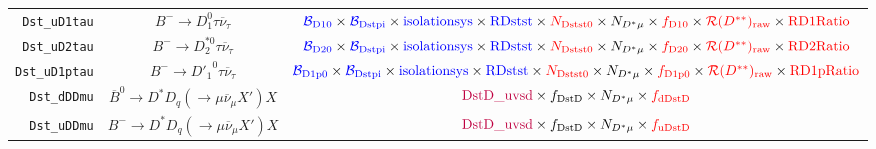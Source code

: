 \begin{landscape}
\begin{table}
\begin{tabular}{r|c|c}
  \texttt{Dst\_uD1tau} &                 $B^- \rightarrow D_1^0 \tau \overline{\nu}_\tau$                  &  $\textcolor{blue}{\mathcal{B}_\text{D10}} \times \textcolor{blue}{\mathcal{B}_\text{Dstpi}} \times \textcolor{blue}{\text{isolationsys}} \times \textcolor{blue}{\text{RDstst}} \times \textcolor{red}{N_\text{Dstst0}} \times N_{D^* \mu} \times \textcolor{red}{f_\text{D10}} \times \textcolor{red}{\mathcal{R}(D^{**})_\text{raw}} \times \textcolor{red}{\text{RD1Ratio}}$   \\
  \texttt{Dst\_uD2tau} &                $B^- \rightarrow D_2^{*0} \tau \overline{\nu}_\tau$                &  $\textcolor{blue}{\mathcal{B}_\text{D20}} \times \textcolor{blue}{\mathcal{B}_\text{Dstpi}} \times \textcolor{blue}{\text{isolationsys}} \times \textcolor{blue}{\text{RDstst}} \times \textcolor{red}{N_\text{Dstst0}} \times N_{D^* \mu} \times \textcolor{red}{f_\text{D20}} \times \textcolor{red}{\mathcal{R}(D^{**})_\text{raw}} \times \textcolor{red}{\text{RD2Ratio}}$   \\
 \texttt{Dst\_uD1ptau} &                $B^- \rightarrow {D'_1}^0 \tau \overline{\nu}_\tau$                & $\textcolor{blue}{\mathcal{B}_\text{D1p0}} \times \textcolor{blue}{\mathcal{B}_\text{Dstpi}} \times \textcolor{blue}{\text{isolationsys}} \times \textcolor{blue}{\text{RDstst}} \times \textcolor{red}{N_\text{Dstst0}} \times N_{D^* \mu} \times \textcolor{red}{f_\text{D1p0}} \times \textcolor{red}{\mathcal{R}(D^{**})_\text{raw}} \times \textcolor{red}{\text{RD1pRatio}}$ \\
   \texttt{Dst\_dDDmu} &  $\overline{B}^0 \rightarrow D^* D_q (\rightarrow \mu \overline{\nu}_\mu X') X$   &                                                                                                                               $\textcolor{purple}{\text{DstD\_uvsd}} \times f_\text{DstD} \times N_{D^* \mu} \times \textcolor{red}{f_\text{dDstD}}$                                                                                                                               \\
   \texttt{Dst\_uDDmu} &        $B^- \rightarrow D^* D_q (\rightarrow \mu \overline{\nu}_\mu X') X$        &                                                                                                                               $\textcolor{purple}{\text{DstD\_uvsd}} \times f_\text{DstD} \times N_{D^* \mu} \times \textcolor{red}{f_\text{uDstD}}$                                                                                                                               \\

\end{tabular}
\end{table}
\end{landscape}
